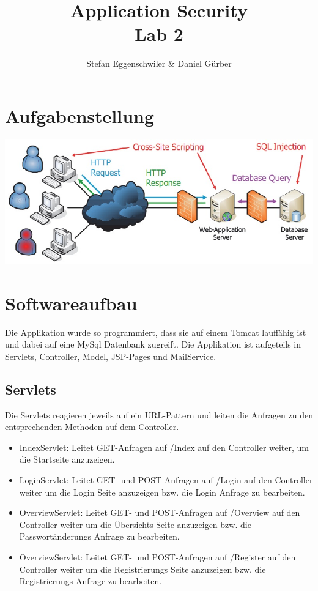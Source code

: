 \documentclass[12pt]{scrartcl}
\author{Stefan Eggenschwiler \& Daniel Gürber}
\title{ %
Application Security
\\Lab 2
\vspace{0.2cm}
}
\begin{document}
 \maketitle
 \thispagestyle{firststyle}
 \pagestyle{firststyle}
 \begin{abstract}
 \begin{center}
 \end{center}
 \vspace{0.5cm}
\hrulefill
\end{abstract}

 \pagestyle{documentstyle}
 \tableofcontents
 \pagebreak
\section{Aufgabenstellung}
\includegraphics[scale=0.5]{./aufgabenstellung.jpg}

\section{Softwareaufbau}
Die Applikation wurde so programmiert, dass sie auf einem Tomcat lauffähig ist und dabei auf eine MySql Datenbank zugreift. Die Applikation ist aufgeteils in Servlets, Controller, Model, JSP-Pages und MailService.
\subsection{Servlets}
Die Servlets reagieren jeweils auf ein URL-Pattern und leiten die Anfragen zu den entsprechenden Methoden auf dem Controller.
\begin{itemize}
\item IndexServlet: Leitet GET-Anfragen auf /Index auf den Controller weiter, um die Startseite anzuzeigen.
\item LoginServlet: Leitet GET- und POST-Anfragen auf /Login auf den Controller weiter um die Login Seite anzuzeigen bzw. die Login Anfrage zu bearbeiten.
\item OverviewServlet: Leitet GET- und POST-Anfragen auf /Overview auf den Controller weiter um die Übersichts Seite anzuzeigen bzw. die Passwortänderungs Anfrage zu bearbeiten.
\item OverviewServlet: Leitet GET- und POST-Anfragen auf /Register auf den Controller weiter um die Registrierungs Seite anzuzeigen bzw. die Registrierungs Anfrage zu bearbeiten.
\end{itemize}
\end{document}
